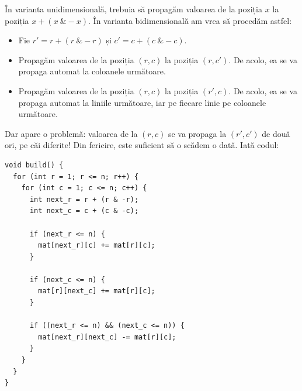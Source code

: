 \documentclass[../main.tex]{subfiles}
\begin{document}
În varianta unidimensională, trebuia să propagăm valoarea de la poziția $x$ la poziția $x + (x \ \& -x)$. În varianta bidimensională am vrea să procedăm astfel:

\begin{itemize}
  \item Fie $r' = r + (r \ \& -r)$ și $c' = c + (c \ \& -c)$.
  \item Propagăm valoarea de la poziția $(r, c)$ la poziția $(r, c')$. De acolo, ea se va propaga automat la coloanele următoare.
  \item Propagăm valoarea de la poziția $(r, c)$ la poziția $(r', c)$. De acolo, ea se va propaga automat la liniile următoare, iar pe fiecare linie pe coloanele următoare.
\end{itemize}

Dar apare o problemă: valoarea de la $(r, c)$ se va propaga la $(r', c')$ de două ori, pe căi diferite! Din fericire, este suficient să o scădem o dată. Iată codul:

\begin{verbatim}
void build() {
  for (int r = 1; r <= n; r++) {
    for (int c = 1; c <= n; c++) {
      int next_r = r + (r & -r);
      int next_c = c + (c & -c);

      if (next_r <= n) {
        mat[next_r][c] += mat[r][c];
      }

      if (next_c <= n) {
        mat[r][next_c] += mat[r][c];
      }

      if ((next_r <= n) && (next_c <= n)) {
        mat[next_r][next_c] -= mat[r][c];
      }
    }
  }
}
\end{verbatim}
\end{document}
